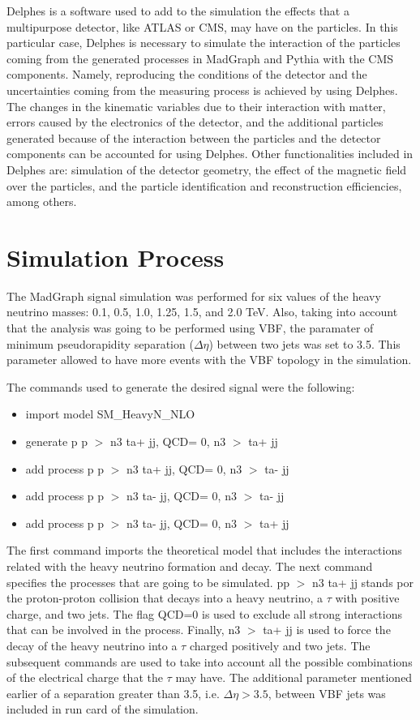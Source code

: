 Delphes is a software used to add to the simulation the effects that a multipurpose detector, like ATLAS or CMS, may have on the particles. In this particular case, Delphes is necessary to simulate the interaction of the particles coming from the generated processes in MadGraph and Pythia with the CMS components. Namely, reproducing the conditions of the detector and the uncertainties coming from the measuring process is achieved by using Delphes. The changes in the kinematic variables due to their interaction with matter, errors caused by the electronics of the detector, and the additional particles generated because of the interaction between the particles and the detector components can be accounted for using Delphes. Other functionalities included in Delphes are: simulation of the detector geometry, the effect of the magnetic field over the particles, and the particle identification and reconstruction efficiencies, among others.


\section{Simulation Process}

The MadGraph signal simulation was performed for six values of the heavy neutrino masses: 0.1, 0.5, 1.0, 1.25, 1.5, and 2.0 TeV. Also, taking into account that the analysis was going to be performed using VBF, the paramater of minimum pseudorapidity separation ($\Delta \eta$) between two jets was set to 3.5. This parameter allowed to have more events with the VBF topology in the simulation.

The commands used to generate the desired signal were the following:

\begin{itemize}
\item import model SM\_HeavyN\_NLO
\item generate p p $>$ n3 ta+ jj, QCD= 0, n3 $>$ ta+ jj
\item add process p p $>$ n3 ta+ jj, QCD= 0, n3 $>$ ta- jj
\item add process p p $>$ n3 ta- jj, QCD= 0, n3 $>$ ta- jj
\item add process p p $>$ n3 ta- jj, QCD= 0, n3 $>$ ta+ jj

\end{itemize}

The first command imports the theoretical model that includes the interactions related with the heavy neutrino formation and decay. The next command specifies the processes that are going to be simulated. pp $>$ n3 ta+ jj stands por the proton-proton collision that decays into a heavy neutrino, a $\tau$ with positive charge, and two jets. The flag QCD=0 is used to exclude all strong interactions that can be involved in the process. Finally, n3 $>$ ta+ jj is used to force the decay of the heavy neutrino into a $\tau$ charged positively and two jets. The subsequent commands are used to take into account all the possible combinations of the electrical charge that the $\tau$ may have. The additional parameter mentioned earlier of a separation greater than 3.5, i.e. $\Delta \eta > 3.5$, between VBF jets was included in run card of the simulation. 


